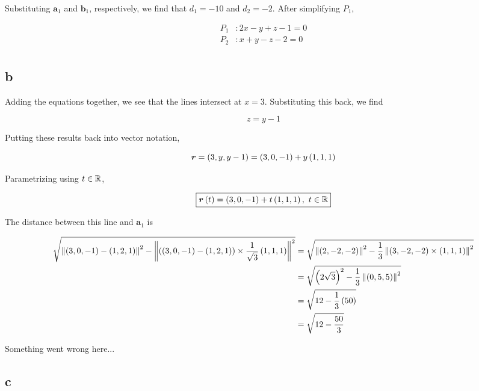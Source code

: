 \documentclass{article}
\begin{document}
Substituting $\bm{a}_1$ and $\bm{b}_1$, respectively, we find that $d_1 = -10$ and $d_2 = -2$.
After simplifying $P_1$,

\begin{align*}
  P_1 &: \boxed{2x - y + z - 1 = 0} \\
  P_2 &: \boxed{x + y - z - 2 = 0} \\
\end{align*}


\subsection*{b}

Adding the equations together, we see that the lines intersect at $x=3$.
Substituting this back, we find

$$
z = y - 1
$$

Putting these results back into vector notation,

$$
\bm{r} = \left ( 3, y, y-1 \right) = \left ( 3, 0, -1 \right) + y \left ( 1, 1, 1 \right)
$$

Parametrizing using $t \in \mathbb R$,

$$
\boxed{\bm{r} \left ( t \right) = \left ( 3, 0, -1 \right) + t \left ( 1, 1, 1 \right),\ t \in \mathbb R}
$$

The distance between this line and $\bm{a}_1$ is

\begin{align*}
  \sqrt{\left\lVert\left ( 3, 0, -1 \right) - \left ( 1, 2, 1 \right)\right\rVert^2 - \left\lVert\left ( \left ( 3, 0, -1 \right) - \left ( 1, 2, 1 \right) \right) \times \frac{1}{\sqrt{3}} \left ( 1, 1, 1 \right)\right\rVert^2} &= \sqrt{\left\lVert\left ( 2, -2, -2 \right)\right\rVert^2 - \frac{1}{3} \left\lVert\left ( 3, -2, -2 \right) \times \left ( 1, 1, 1 \right)\right\rVert^2 } \\
                                                                                                                                               &= \sqrt{\left ( 2 \sqrt{3} \right)^2 - \frac{1}{3} \left\lVert\left ( 0, 5, 5 \right)\right\rVert^2 } \\
                                                                                                                                               &= \sqrt{12 - \frac{1}{3} \left ( 50 \right)} \\
                                                                                                                                               &= \sqrt{12 - \frac{50}{3}} \\
\end{align*}

Something went wrong here...

\subsection*{c}
\end{document}
